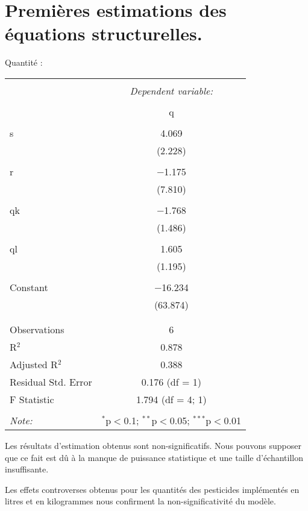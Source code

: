 \documentclass[11pt, a4paper]{article}
\begin{document}
\newpage
\section*{Premières estimations des équations structurelles.}
\par
Quantité :
\FloatBarrier
\begin{center}
\begin{tabular}{@{\extracolsep{5pt}}lc} 
\\[-1.8ex]\hline 
\hline \\[-1.8ex] 
 & \multicolumn{1}{c}{\textit{Dependent variable:}} \\ 
\cline{2-2} 
\\[-1.8ex] & q \\ 
\hline \\[-1.8ex]
 s & 4.069 \\ 
  & (2.228) \\ 
  & \\ 
 r & $-$1.175 \\ 
  & (7.810) \\ 
  & \\
 qk & $-$1.768 \\ 
  & (1.486) \\ 
  & \\ 
 ql & 1.605 \\ 
  & (1.195) \\ 
  & \\
 Constant & $-$16.234 \\ 
  & (63.874) \\ 
  & \\ 
\hline \\[-1.8ex] 
Observations & 6 \\ 
R$^{2}$ & 0.878 \\ 
Adjusted R$^{2}$ & 0.388 \\ 
Residual Std. Error & 0.176 (df = 1) \\ 
F Statistic & 1.794 (df = 4; 1) \\ 
\hline 
\hline \\[-1.8ex] 
\textit{Note:}  & \multicolumn{1}{r}{$^{*}$p$<$0.1; $^{**}$p$<$0.05; $^{***}$p$<$0.01} 
\\
\end{tabular} 
\end{center}
\FloatBarrier
Les résultats d'estimation obtenus sont non-significatifs.
Nous pouvons supposer que ce fait est dû à la manque de puissance statistique et une taille d'échantillon insuffisante.
\par
Les effets controverses obtenus pour les quantités des pesticides implémentés en litres et en kilogrammes nous confirment la non-significativité du modèle.
\end{document}
